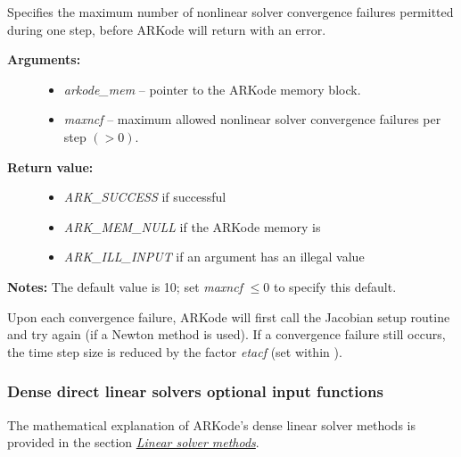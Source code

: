 \documentclass[letterpaper,10pt,english]{sphinxmanual}
\begin{document}
\begin{fulllineitems}
\label{c_interface/User_callable:ARKodeSetMaxConvFails}
Specifies the maximum number of nonlinear solver
convergence failures permitted during one step, before ARKode will
return with an error.
\begin{description}
\item[{\textbf{Arguments:}}] \leavevmode\begin{itemize}
\item {} 
\emph{arkode\_mem} -- pointer to the ARKode memory block.

\item {} 
\emph{maxncf} -- maximum allowed nonlinear solver convergence failures
per step $(>0)$.

\end{itemize}

\item[{\textbf{Return value:}}] \leavevmode\begin{itemize}
\item {} 
\emph{ARK\_SUCCESS} if successful

\item {} 
\emph{ARK\_MEM\_NULL} if the ARKode memory is 

\item {} 
\emph{ARK\_ILL\_INPUT} if an argument has an illegal value

\end{itemize}

\end{description}

\textbf{Notes:} The default value is 10; set \emph{maxncf} $\le 0$
to specify this default.

Upon each convergence failure, ARKode will first call the Jacobian
setup routine and try again (if a Newton method is used).  If a
convergence failure still occurs, the time step size is reduced by
the factor \emph{etacf} (set within {\hyperref[c_interface/User_callable:ARKodeSetMaxCFailGrowth]{}}).

\end{fulllineitems}



\subsubsection{Dense direct linear solvers optional input functions}
\label{c_interface/User_callable:dense-direct-linear-solvers-optional-input-functions}\label{c_interface/User_callable:cinterface-arkdlsinputs}
The mathematical explanation of ARKode's dense linear solver methods
is provided in the section {\hyperref[Mathematics:mathematics-linear]{\emph{Linear solver methods}}}.
\end{document}
